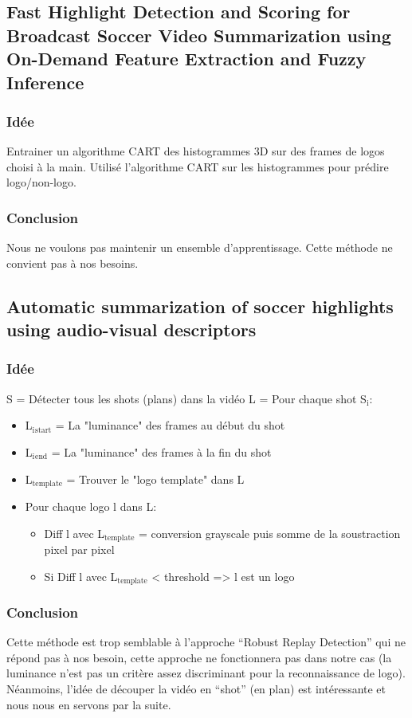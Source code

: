 \documentclass[11pt]{article}
\begin{document}
\subsection{Fast Highlight Detection and Scoring for Broadcast Soccer Video Summarization using On-Demand Feature Extraction and Fuzzy Inference}
\label{sec-4-2}
\subsubsection{Idée}
\label{sec-4-2-1}
Entrainer un algorithme CART des histogrammes 3D sur des frames de logos choisi à la main.
Utilisé l'algorithme CART sur les histogrammes pour prédire logo/non-logo.

\subsubsection{Conclusion}
\label{sec-4-2-2}
Nous ne voulons pas maintenir un ensemble d’apprentissage. Cette méthode ne convient pas à nos besoins.

\subsection{Automatic summarization of soccer highlights using audio-visual descriptors}
\label{sec-4-3}
\subsubsection{Idée}
\label{sec-4-3-1}
S = Détecter tous les shots (plans) dans la vidéo 
L = Pour chaque shot S$_{\text{i}}$:
\begin{itemize}
\item L$_{\text{i}}$$_{\text{start}}$ = La "luminance" des frames au début du shot
\item L$_{\text{i}}$$_{\text{end}}$ = La "luminance" des frames à la fin du shot
\item L$_{\text{template}}$ = Trouver le "logo template" dans L
\item Pour chaque logo l dans L:
\begin{itemize}
\item Diff l avec L$_{\text{template}}$ = conversion grayscale puis somme de la soustraction pixel par pixel
\item Si Diff l avec L$_{\text{template}}$ < threshold => l est un logo
\end{itemize}
\end{itemize}

\subsubsection{Conclusion}
\label{sec-4-3-2}
Cette méthode est trop semblable à l’approche “Robust Replay Detection” qui ne répond pas à nos besoin, 
cette approche ne fonctionnera pas dans notre cas (la luminance n’est pas un critère assez discriminant
pour la reconnaissance de logo). Néanmoins, l’idée de découper la vidéo en “shot” (en plan) est
intéressante et nous nous en servons par la suite.
\end{document}
